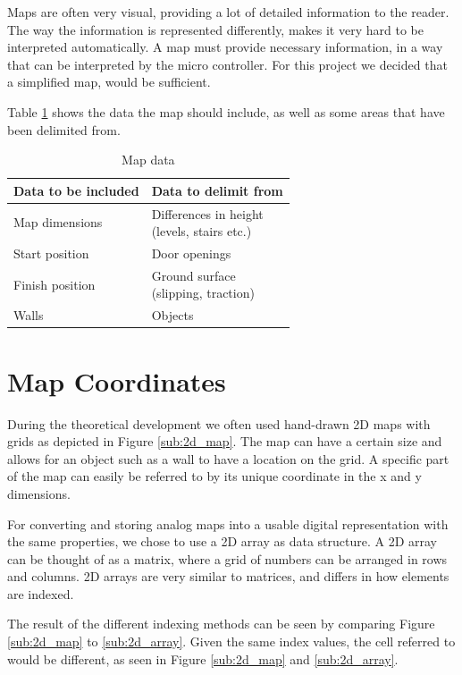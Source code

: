 Maps are often very visual, providing a lot of detailed information to the reader.
The way the information is represented differently,
makes it very hard to be interpreted automatically.
A map must provide necessary information,
in a way that can be interpreted by the micro controller.
For this project we decided that a simplified map, would be sufficient.

Table \ref{table:map_data} shows the data the map should include,
as well as some areas that have been delimited from.

\begin{table}[h!]
	\centering
	\caption{Map data}
	\begin{tabular}{|p{}||p{}|}
		\hline
		Data to be included & Data to delimit from \\ 
		\hline
		Map dimensions 		& \parbox[t]{0.4\textwidth}{Differences in height\\(levels, stairs etc.)}\\
		\hline
		Start position 		& Door openings \\
		\hline
		Finish position 	& \parbox[t]{0.4\textwidth}{Ground surface\\(slipping, traction)} \\
		\hline
		Walls 				& Objects\\
		\hline
	\end{tabular}
	\label{table:map_data}
\end{table}

\section{Map Coordinates}
\label{sec:map_coordinates} %
During the theoretical development we often used hand-drawn 2D maps with grids as depicted in Figure \ref{sub:2d_map}. 
The map can have a certain size and allows for an object such as a wall to have a location on the grid. 
A specific part of the map can easily be referred to by its unique coordinate in the x and y dimensions. 

For converting and storing analog maps into a usable digital representation with the same properties, 
we chose to use a 2D array as data structure. 
A 2D array can be thought of as a matrix, where a grid of numbers can be arranged in rows and columns. 
2D arrays are very similar to matrices, and differs in how elements are indexed.

The result of the different indexing methods can be seen by comparing Figure \ref{sub:2d_map} to \ref{sub:2d_array}. 
Given the same index values, the cell referred to would be different, 
as seen in  Figure \ref{sub:2d_map} and \ref{sub:2d_array}.



